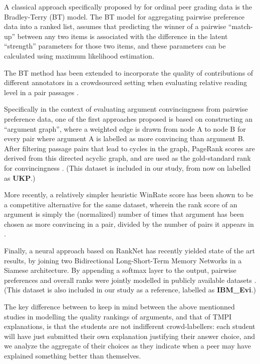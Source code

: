 \documentclass[notitlepage,12pt]{jedm}
\begin{document}
A classical approach specifically proposed by \cite{raman_methods_2014} for 
ordinal peer grading data is the Bradley-Terry (BT) model.
The BT model \cite{bradley_rank_1952} for aggregating pairwise preference data 
into a ranked list, assumes that predicting the winner of a pairwise 
``match-up'' between any two items is associated with the difference in the 
latent ``strength'' parameters for those two items, and these parameters can be 
calculated using maximum likelihood estimation.

The BT method has been extended to incorporate the quality of contributions of 
different annotators in a crowdsourced setting when evaluating relative reading 
level in a pair passages \cite{chen_pairwise_2013}. 

Specifically in the context of evaluating argument convincingness from pairwise 
preference data, one of the first approaches proposed is based on constructing 
an ``argument graph'', where a weighted edge is drawn from node A to node B for 
every pair where argument A is labelled as more convincing than argument B. 
After filtering passage pairs that lead to cycles in the graph, PageRank scores 
are derived from this directed acyclic graph, and are used as the gold-standard 
rank for convincingness \cite{habernal_which_2016}.
(This dataset is included in our study, from now on labelled as \textbf{UKP}.)

More recently, a relatively simpler heuristic WinRate score has been shown to 
be a competitive alternative for the same dataset, wherein the rank score of an 
argument is simply the (normalized) number of times that argument has been 
chosen as more convincing in a pair, divided by the number of pairs it appears 
in \cite{potash_ranking_2019}.

Finally, a neural approach based on RankNet has recently yielded state of the 
art results, by joining two Bidirectional Long-Short-Term Memory Networks in a 
Siamese architecture. By appending a softmax layer to the output, pairwise 
preferences and overall ranks were jointly modelled in publicly available 
datasets \cite{gleize_are_2019}.
(This dataset is also included in our study as a reference, labelled as 
\textbf{IBM\_Evi}.)

The key difference between to keep in mind between the above mentionned studies 
in modelling the quality rankings of arguments, and that of TMPI explanations, 
is that the students are not indifferent crowd-labellers: each student will 
have just submitted their own explanation justifying their answer choice, and 
we analyze the aggregate of their choices as they indicate when a peer may have 
explained something better than themselves.
\end{document}
